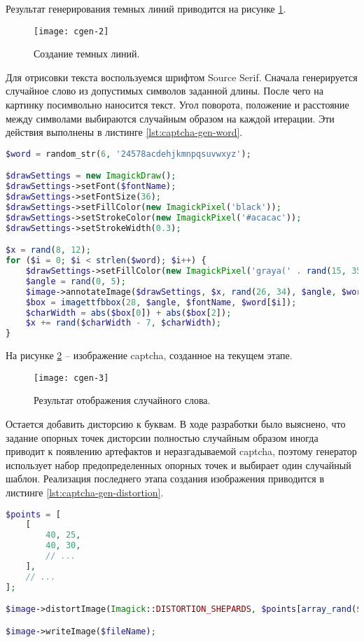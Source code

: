Результат генерирования темных линий приводится на рисунке \ref{fig:cgen-2}.
\begin{figure}[h]
	\centering
	\texttt{[image: cgen-2]}
	\caption{Создание темных линий.}
	\label{fig:cgen-2}
\end{figure}

Для отрисовки текста воспользуемся шрифтом Source Serif. Сначала генерируется случайное слово из допустимых символов заданной длины. После чего на картинку посимвольно наносится текст. Угол поворота, положение и расстояние между символами выбираются случайным образом на каждой итерации. Эти действия выполнены в листинге \ref{lst:captcha-gen-word}.
\begin{lstlisting}[language=PHP,basicstyle=\fontsize{11}{11}\selectfont,tabsize=4,breaklines=true,caption={Отрисовка случайного слова.},captionpos=b,label={lst:captcha-gen-word}]
$word = random_str(6, '24578acdehjkmnpqsuvwxyz');

$drawSettings = new ImagickDraw();
$drawSettings->setFont($fontName);
$drawSettings->setFontSize(36);
$drawSettings->setFillColor(new ImagickPixel('black'));
$drawSettings->setStrokeColor(new ImagickPixel('#acacac'));
$drawSettings->setStrokeWidth(0.3);

$x = rand(8, 12);
for ($i = 0; $i < strlen($word); $i++) {
	$drawSettings->setFillColor(new ImagickPixel('graya(' . rand(15, 35) . '%, 1)'));
	$angle = rand(0, 5);
	$image->annotateImage($drawSettings, $x, rand(26, 34), $angle, $word[$i]);
	$box = imagettfbbox(28, $angle, $fontName, $word[$i]);
	$charWidth = abs($box[0]) + abs($box[2]);
	$x += rand($charWidth - 7, $charWidth);
}
\end{lstlisting}

На рисунке \ref{fig:cgen-3} -- изображение captcha, созданное на текущем этапе.
\begin{figure}[h]
	\centering
	\texttt{[image: cgen-3]}
	\caption{Результат отображения случайного слова.}
	\label{fig:cgen-3}
\end{figure}

Остается добавить дисторсию к буквам. В ходе разработки было выяснено, что задание опорных точек дисторсии полностью случайным образом иногда приводит к появлению артефактов и неразгадываемой captcha, поэтому генератор использует набор предопределенных опорных точек и выбирает один случайный шаблон. Реализация последнего этапа создания изображения приводится в листинге \ref{lst:captcha-gen-distortion}.
\begin{lstlisting}[language=PHP,basicstyle=\fontsize{11}{11}\selectfont,tabsize=4,breaklines=true,caption={Применение дисторсии.},captionpos=b,label={lst:captcha-gen-distortion}]
$points = [
	[
		40, 25,
		40, 30,
		// ...
	],
	// ...
];

$image->distortImage(Imagick::DISTORTION_SHEPARDS, $points[array_rand($points)], true);

$image->writeImage($fileName);
\end{lstlisting}

